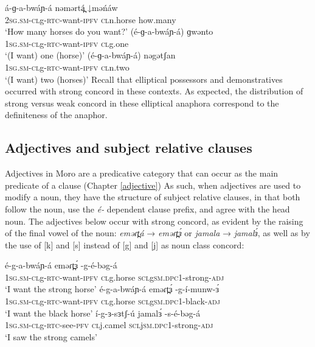 \ea 
	\ea \gll	á-ɡ-a-bwáɲ-á 				nəmərtá̪ 	↓məńáw\\
				2\textsc{sg}.\textsc{sm}-\textsc{cl}g-\textsc{rtc}-want-\textsc{\textsc{ipfv}} 	\textsc{cl}n.horse 	how.many\\
		\glt 	‘How many horses do you want?’
	\ex	\gll	(é-ɡ-a-bwáɲ-á) 				ɡwənto\\
				1\textsc{sg}.\textsc{sm}-\textsc{cl}g-\textsc{rtc}-want-\textsc{\textsc{ipfv}}	\textsc{cl}g.one\\
		\glt 	‘(I want) one (horse)’
	\ex	\gll 	(é-ɡ-a-bwáɲ-á) 				nəgətʃan\\
				1\textsc{sg}.\textsc{sm}-\textsc{cl}g-\textsc{rtc}-want-\textsc{\textsc{ipfv}}	\textsc{cl}n.two\\
		\glt 	‘(I want) two (horses)’
	\z 
\z
Recall that elliptical possessors and demonstratives occurred with strong concord in these contexts. As expected, the distribution of strong versus weak concord in these elliptical anaphora correspond to the definiteness of the anaphor.



\subsection{Adjectives and subject relative clauses}\label{section:adjsubrelative}

Adjectives in Moro are a predicative category that can occur as the main predicate of a clause (Chapter \ref{adjective}) As such, when adjectives are used to modify a noun, they have the structure of subject relative clauses, in that both follow the noun, use the \textit{é-} dependent clause prefix, and agree with the head noun. The adjectives below occur with strong concord, as evident by the raising of the final vowel of the noun: \textit{eməɾt̪á} → \textit{eməɾt̪ɜ́}  or \textit{jamala} → \textit{jamalɜ́}, as well as by the use of [k] and [s] instead of [g] and [j] as noun class concord:

\ea %
	\ea \gll	é-g-a-bwáɲ-á 	eməɾt̪ɜ́ 	-g-é-bəg-á \\
				1\textsc{sg}.\textsc{sm}-\textsc{cl}g-\textsc{rtc}-want-\textsc{\textsc{ipfv}}  	\textsc{cl}g.horse	\textsc{scl}g\textsc{sm}.\textsc{dpc}1-strong-\textsc{adj}\\
		\glt	‘I want the strong horse’
	\ex	\gll	é-g-a-bwáɲ-á 	eməɾt̪ɜ́ 	-g-í-munw-ɜ́\\
				1\textsc{sg}.\textsc{sm}-\textsc{cl}g-\textsc{rtc}-want-\textsc{\textsc{ipfv}}  	\textsc{cl}g.horse	\textsc{scl}g\textsc{sm}.\textsc{dpc}1-black-\textsc{adj}\\
		\glt	‘I want the black horse’
	\ex	\gll	í-g-ɜ-sɜtʃ-ú 	jamalɜ́ 	-s-é-bəg-á\\
				1\textsc{sg}.\textsc{sm}-\textsc{cl}g-\textsc{rtc}-see-\textsc{pfv}  	\textsc{cl}j.camel	\textsc{scl}j\textsc{sm}.\textsc{dpc}1-strong-\textsc{adj}\\
		\glt 	‘I saw the strong camels’
	\z
\z

